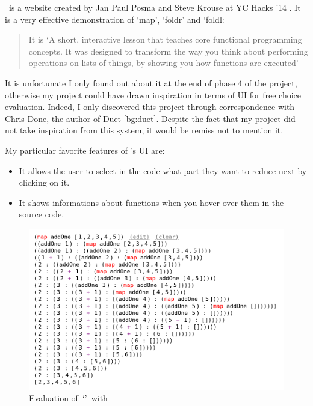 \llessons\ is a website created by Jan Paul Posma and Steve Krouse at YC Hacks '14 \cite{lambdalessons}. It is a very effective demonstration of `map', `foldr' and `foldl:

\begin{quotation}
\noindent It is `A short, interactive lesson that teaches core functional programming concepts. It was designed to transform the way you think about performing operations on lists of things, by showing you how functions are executed' \cite{lambdalessons}
\end{quotation}

\noindent It is unfortunate I only found out about it at the end of phase 4 of the project, otherwise my project could have drawn inspiration in terms of UI for free choice evaluation. Indeed, I only discovered this project through correspondence with Chris Done, the author of Duet \ref{bg:duet}. Despite the fact that my project did not take inspiration from this system, it would be remiss not to mention it. 

My particular favorite features of \llessons's UI are:

\begin{itemize}
    \item It allows the user to select in the code what part they want to reduce next by clicking on it. 
    \item It shows informations about functions when you hover over them in the source code. 
\end{itemize}


\begin{figure}[t]
    \centering
    \includegraphics[width=0.75\linewidth]{images/LLessonsMap.png}
    \caption{Evaluation of\ `'\ with \llessons}
    \label{bg:llessons_ui}
\end{figure}

